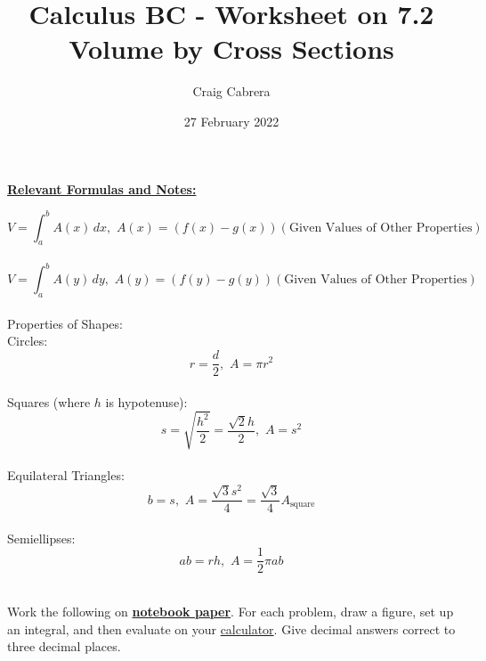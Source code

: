 \documentclass[10pt,letterpaper]{report}
\title{Calculus BC - Worksheet on 7.2 \\
      \large Volume by Cross Sections}
\author{Craig Cabrera}
\date{27 February 2022}
\begin{document}
\maketitle
\begin{center}
  \textbf{\underline{Relevant Formulas and Notes:}}
\end{center}

$$V=\int_{a}^{b}{A(x)}\,dx, \, \, A(x)=(f(x)-g(x))(\text{Given Values of Other Properties})$$ \\

$$V=\int_{a}^{b}{A(y)}\,dy, \, \, A(y)=(f(y)-g(y))(\text{Given Values of Other Properties})$$ \\

Properties of Shapes:  \\

Circles: \\

$$r=\frac{d}{2}, \, \, A=\pi r^{2}$$ \\

Squares (where $h$ is hypotenuse): \\

$$s=\sqrt{\frac{h^{2}}{2}}=\frac{\sqrt{2}h}{2}, \, \, A=s^{2}$$ \\

Equilateral Triangles: \\

$$b=s, \, \, A=\frac{\sqrt{3}s^{2}}{4}=\frac{\sqrt{3}}{4}A_{\text{square}}$$ \\

Semiellipses: \\

$$ab=rh, \, \, A=\frac{1}{2}\pi ab$$ \\

\pagebreak 


\noindent Work the following on \textbf{\underline{notebook paper}}. For each problem, draw a figure, set up an integral, and then evaluate on your \underline{calculator}. Give decimal answers correct to three decimal places. \\
\end{document}
